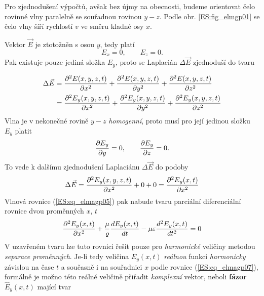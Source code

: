       Pro zjednodušení výpočtů, avšak bez újmy na obecnosti, budeme orientovat čelo rovinné vlny 
      paralelně se souřadnou rovinou \(y-z\). Podle obr. \ref{ES:fig_elmgp01} se čelo vlny šíří 
      rychlostí \(v\) ve směru kladné osy \(x\).
      
      Vektor \(\vec{E}\) je ztotožněn s osou \(y\), tedy platí
      \begin{equation}\label{ES:eq_elmagp08}
         E_x = 0, \qquad E_z = 0.
      \end{equation}
      Pak existuje pouze jediná složka \(E_y\), proto se Laplacián \(\Delta\vec{E}\) zjednoduší do 
      tvaru
      
      \begin{align*}                  %
        \Delta\vec{E} &= \ppder{E(x,y,z,t)}{x} + 
                         \ppder{E(x,y,z,t)}{y} + \ppder{E(x,y,z,t)}{z}      \\
                      &= \ppder{E_y(x,y,z,t)}{x} + 
                         \ppder{E_y(x,y,z,t)}{y} + \ppder{E_y(x,y,z,t)}{z}
      \end{align*}
      Vlna je v nekonečné rovině \(y-z\) \emph{homogenní}, proto musí pro její jedinou složku 
      \(E_y\) platit
      \begin{equation}\label{ES:eq_elmagp10}
        \dfrac{\partial E_y}{\partial y} = 0, \qquad \dfrac{\partial E_y}{\partial z} = 0.
      \end{equation}
      To vede k dalšímu zjednodušení Laplaciánu \(\Delta\vec{E}\) do podoby
      \begin{equation}\label{ES:eq_elmagp11}
        \Delta\vec{E} = \dfrac{\partial^2 E_y(x,y,z,t)}{\partial x^2} + 0 + 0 = \dfrac{\partial^2 E_y(x,t)}{\partial x^2}
      \end{equation}
      Vlnová rovnice (\ref{ES:eq_elmagp05}) pak nabude tvaru parciální diferenciální rovnice dvou 
      proměnných \(x\), \(t\)
      \begin{equation}\label{ES:eq_elmagp12}
        \dfrac{\partial^2 E_y(x,t)}{\partial x^2} + 
        \frac{\mu}{\varrho}\dfrac{d E_y(x,t)}{d t} - 
        \mu\varepsilon\dfrac{d^2 E_y(x,t)}{d t^2} = 0
      \end{equation}
      V uzavřeném tvaru lze tuto rovnici řešit pouze pro \emph{harmonické} veličiny metodou 
      \emph{separace proměnných}. Je-li tedy veličina \(E_y(x,t)\) \emph{reálnou} funkcí 
      \emph{harmonicky} závislou na čase \(t\) a současně i na souřadnici \(x\) podle rovnice 
      (\ref{ES:eq_elmagp07}), formálně je možno této reálné veličině přiřadit \emph{komplexní}
      vektor, neboli \textbf{fázor} \(\hat{E}_y(x,t)\) mající tvar
